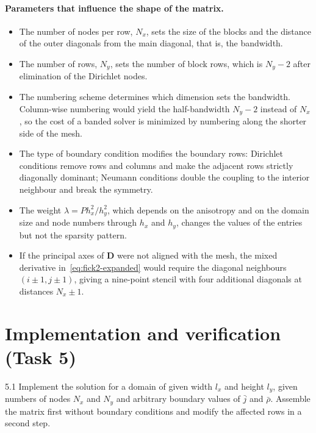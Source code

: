 \documentclass[11pt,a4paper]{article}
\numberwithin{equation}{section}
\theoremstyle{definition}
\theoremstyle{remark}
\newcommand{\bD}{\mathbf{D}}
\begin{document}
\paragraph{Parameters that influence the shape of the matrix.}
\begin{itemize}
  \item The number of nodes per row, $N_x$, sets the size of the blocks and the distance
    of the outer diagonals from the main diagonal, that is, the bandwidth.
  \item The number of rows, $N_y$, sets the number of block rows, which is $N_y - 2$ after
    elimination of the Dirichlet nodes.
  \item The numbering scheme determines which dimension sets the bandwidth. Column-wise
    numbering would yield the half-bandwidth $N_y - 2$ instead of $N_x$, so the cost of a
    banded solver is minimized by numbering along the shorter side of the mesh.
  \item The type of boundary condition modifies the boundary rows: Dirichlet conditions
    remove rows and columns and make the adjacent rows strictly diagonally dominant;
    Neumann conditions double the coupling to the interior neighbour and break the
    symmetry.
  \item The weight $\lambda = P h_x^2/h_y^2$, which depends on the anisotropy and on the
    domain size and node numbers through $h_x$ and $h_y$, changes the values of the
    entries but not the sparsity pattern.
  \item If the principal axes of $\bD$ were not aligned with the mesh, the mixed
    derivative in~\eqref{eq:fick2-expanded} would require the diagonal neighbours
    $(i \pm 1, j \pm 1)$, giving a nine-point stencil with four additional diagonals at
    distances $N_x \pm 1$.
\end{itemize}

\section{Implementation and verification (Task 5)}\label{sec:task5}

\begin{task}{5.1}
  Implement the solution for a domain of given width $l_x$ and height $l_y$, given numbers of
  nodes $N_x$ and $N_y$ and arbitrary boundary values of $\bar j$ and $\bar\rho$. Assemble the
  matrix first without boundary conditions and modify the affected rows in a second step.
\end{task}
\end{document}

